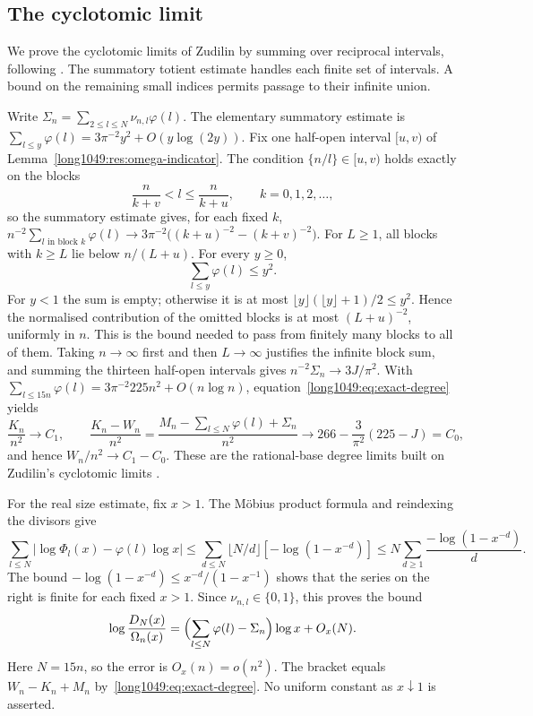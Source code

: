 \subsection{The cyclotomic limit}\label{long1049:sec:cyclotomic-limit}

We prove the cyclotomic limits of Zudilin
\cite[Lemmas~1--2, p.~155]{zudilin2004} by summing over reciprocal
intervals, following \cite[Lemma~1, p.~466]{zudilin2002}. The
summatory totient estimate handles each finite set of intervals.
A bound on the remaining small indices permits passage to their
infinite union.

Write $\Sigma_n=\sum_{2\le l\le N}\nu_{n,l}\varphi(l)$.  The elementary
summatory estimate is $\sum_{l\le y}\varphi(l)=3\pi^{-2}y^{2}+O(y\log(2y))$.
Fix one half-open interval $[u,v)$ of Lemma~\ref{long1049:res:omega-indicator}.  The condition
$\{n/l\}\in[u,v)$ holds exactly on the blocks
\[
 \frac{n}{k+v}<l\le\frac{n}{k+u},\qquad k=0,1,2,\dots,
\]
so the summatory estimate gives, for each fixed $k$,
$n^{-2}\sum_{l\text{ in block }k}\varphi(l)\to3\pi^{-2}\bigl((k+u)^{-2}-(k+v)^{-2}\bigr)$.
For $L\ge1$, all blocks with $k\ge L$ lie below $n/(L+u)$. For every
$y\ge0$,
\[
 \sum_{l\le y}\varphi(l)\le y^2.
\]
For $y<1$ the sum is empty; otherwise it is at most
$\lfloor y\rfloor(\lfloor y\rfloor+1)/2\le y^2$. Hence the normalised
contribution of the omitted blocks is at most $(L+u)^{-2}$, uniformly
in $n$. This is the bound needed to pass from finitely many blocks to
all of them. Taking $n\to\infty$ first and then $L\to\infty$ justifies the
infinite block sum, and summing the thirteen half-open intervals gives
$n^{-2}\Sigma_n\to3J/\pi^{2}$.  With $\sum_{l\le15n}\varphi(l)=3\pi^{-2}225n^{2}+O(n\log n)$,
equation~\eqref{long1049:eq:exact-degree} yields
\begin{equation}\label{long1049:eq:degree-limits}
 \frac{K_n}{n^{2}}\to C_1,
 \qquad
 \frac{K_n-W_n}{n^{2}}=\frac{M_n-\sum_{l\le N}\varphi(l)+\Sigma_n}{n^{2}}
 \to266-\frac{3}{\pi^{2}}(225-J)=C_0,
\end{equation}
and hence $W_n/n^{2}\to C_1-C_0$.  These are the rational-base degree limits
built on Zudilin's cyclotomic limits \cite[Lemmas~1--2, p.~155; (26),
p.~162]{zudilin2004}.

For the real size estimate, fix $x>1$. The M\"obius product formula
and reindexing the divisors give
\[
 \sum_{l\le N}|\log\Phi_l(x)-\varphi(l)\log x|
 \le \sum_{d\le N}\lfloor N/d\rfloor[-\log(1-x^{-d})]
 \le N\sum_{d\ge1}\frac{-\log(1-x^{-d})}{d}.
\]
The bound $-\log(1-x^{-d})\le x^{-d}/(1-x^{-1})$ shows that the
series on the right is finite for each fixed $x>1$.
Since $\nu_{n,l}\in\{0,1\}$, this proves the bound
\begin{equation}\label{long1049:eq:cyclotomic-size}
 \log\frac{D_N(x)}{\Omega_n(x)}
 =\Bigl(\sum_{l\le N}\varphi(l)-\Sigma_n\Bigr)\log x+O_x(N).
\end{equation}
Here $N=15n$, so the error is $O_x(n)=o(n^2)$. The bracket equals
$W_n-K_n+M_n$ by~\eqref{long1049:eq:exact-degree}. No uniform constant as
$x\downarrow1$ is asserted.

